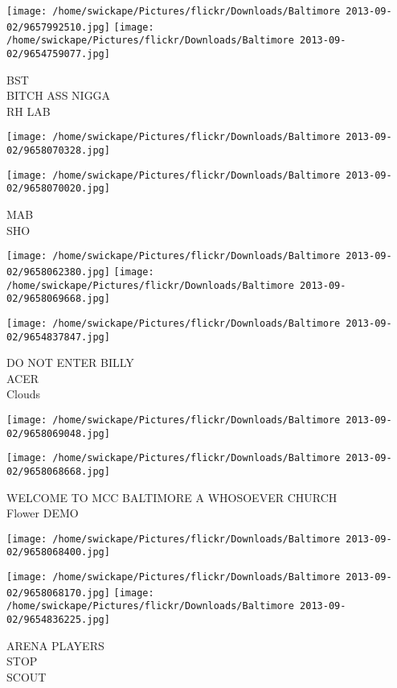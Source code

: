 \documentclass[10pt,letterpaper]{article}
\begin{document}
\vspace{0.25in}
\texttt{[image: /home/swickape/Pictures/flickr/Downloads/Baltimore 2013-09-02/9657992510.jpg]}
\texttt{[image: /home/swickape/Pictures/flickr/Downloads/Baltimore 2013-09-02/9654759077.jpg]}

BST\\
BITCH ASS NIGGA\\
RH LAB
\pagebreak

\texttt{[image: /home/swickape/Pictures/flickr/Downloads/Baltimore 2013-09-02/9658070328.jpg]}

\vspace{0.25in}
\texttt{[image: /home/swickape/Pictures/flickr/Downloads/Baltimore 2013-09-02/9658070020.jpg]}

MAB\\
SHO
\pagebreak

\texttt{[image: /home/swickape/Pictures/flickr/Downloads/Baltimore 2013-09-02/9658062380.jpg]}
\texttt{[image: /home/swickape/Pictures/flickr/Downloads/Baltimore 2013-09-02/9658069668.jpg]}

\vspace{0.25in}
\texttt{[image: /home/swickape/Pictures/flickr/Downloads/Baltimore 2013-09-02/9654837847.jpg]}

DO NOT ENTER BILLY\\
ACER\\
Clouds
\pagebreak

\texttt{[image: /home/swickape/Pictures/flickr/Downloads/Baltimore 2013-09-02/9658069048.jpg]}

\vspace{0.25in}
\texttt{[image: /home/swickape/Pictures/flickr/Downloads/Baltimore 2013-09-02/9658068668.jpg]}

WELCOME TO MCC BALTIMORE A WHOSOEVER CHURCH\\
Flower DEMO
\pagebreak

\texttt{[image: /home/swickape/Pictures/flickr/Downloads/Baltimore 2013-09-02/9658068400.jpg]}

\vspace{0.25in}
\texttt{[image: /home/swickape/Pictures/flickr/Downloads/Baltimore 2013-09-02/9658068170.jpg]}
\texttt{[image: /home/swickape/Pictures/flickr/Downloads/Baltimore 2013-09-02/9654836225.jpg]}

ARENA PLAYERS\\
STOP\\
SCOUT
\pagebreak
\end{document}
